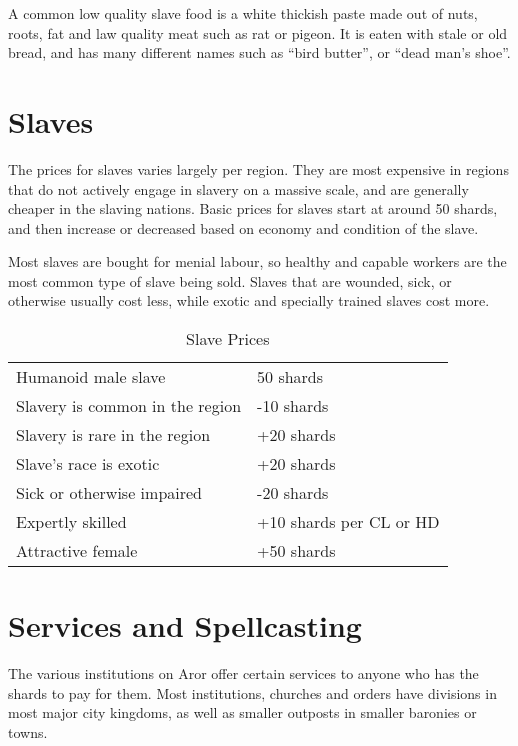A common low quality slave food is a white thickish paste made out of nuts,
roots, fat and law quality meat such as rat or pigeon. It is eaten with
stale or old bread, and has many different names such as ``bird butter'',
or ``dead man's shoe''.

\section{Slaves}
\label{sec:Slave Prices}

The prices for slaves varies largely per region. They are most expensive in
regions that do not actively engage in slavery on a massive scale, and are
generally cheaper in the slaving nations. Basic prices for slaves start at
around 50 shards, and then increase or decreased based on economy and
condition of the slave.

Most slaves are bought for menial labour, so healthy and capable workers are
the most common type of slave being sold. Slaves that are wounded, sick, or
otherwise usually cost less, while exotic and specially trained slaves cost
more.

\begin{table*}
  \caption{Slave Prices} \label{tbl:Slave Prices}
  \begin{tabular}{p{10cm} l}
    Humanoid male slave             &  50 shards \\
    Slavery is common in the region & -10 shards \\
    Slavery is rare in the region   & +20 shards \\
    Slave's race is exotic          & +20 shards \\
    Sick or otherwise impaired      & -20 shards \\
    Expertly skilled                & +10 shards per CL or HD \\
    Attractive female               & +50 shards
  \end{tabular}
\end{table*}

\section{Services and Spellcasting}
\label{sec:Services}

The various institutions on Aror offer certain services to anyone who has the
shards to pay for them. Most institutions, churches and orders have divisions
in most major city kingdoms, as well as smaller outposts in smaller baronies
or towns.

